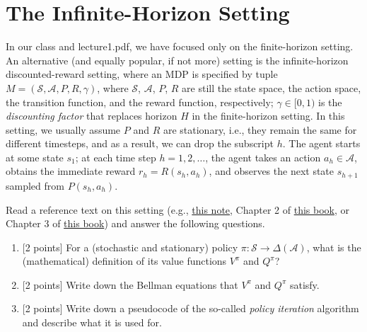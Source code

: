 \section{The Infinite-Horizon Setting}
In our class and lecture1.pdf, we have focused only on the finite-horizon setting.
An alternative (and equally popular, if not more) setting is the infinite-horizon discounted-reward setting, where an MDP is specified by tuple $M=(\mathcal{S}, \mathcal{A}, P, R, \gamma)$, where $\mathcal{S}$, $\mathcal{A}$, $P$, $R$ are still the state space, the action space, the transition function, and the reward function, respectively; $\gamma\in[0,1)$ is the {\em discounting factor} that replaces horizon $H$ in the finite-horizon setting. 
In this setting, we usually assume $P$ and $R$ are stationary, i.e., they remain the same for different timesteps, and as a result, we can drop the subscript $h$.
The agent starts at some state $s_1$; at each time step $h=1,2, \ldots$, the agent takes an action $a_h \in \mathcal{A}$, obtains the immediate reward $r_h=R\left(s_h, a_h\right)$, and observes the next state $s_{h+1}$ sampled from $P\left(s_h, a_h\right)$.

Read a reference text on this setting (e.g., 
\href{https://nanjiang.cs.illinois.edu/files/cs542f22/note1.pdf}{this note},
Chapter 2 of \href{https://sites.ualberta.ca/~szepesva/papers/RLAlgsInMDPs.pdf}{this book},
or Chapter 3 of \href{https://web.stanford.edu/class/psych209/Readings/SuttonBartoIPRLBook2ndEd.pdf}{this book})
and answer the following questions.

\begin{enumerate}[label=(\alph*)]
\item {[2 points]} For a (stochastic and stationary) policy $\pi:\mathcal{S}\to\Delta(\mathcal{A})$, what is the (mathematical) definition of its value functions $V^\pi$ and $Q^\pi$?

\item {[2 points]} Write down the Bellman equations that $V^\pi$ and $Q^\pi$ satisfy.

\item {[2 points]} Write down a pseudocode of the so-called {\em policy iteration} algorithm and describe what it is used for.
\end{enumerate}



